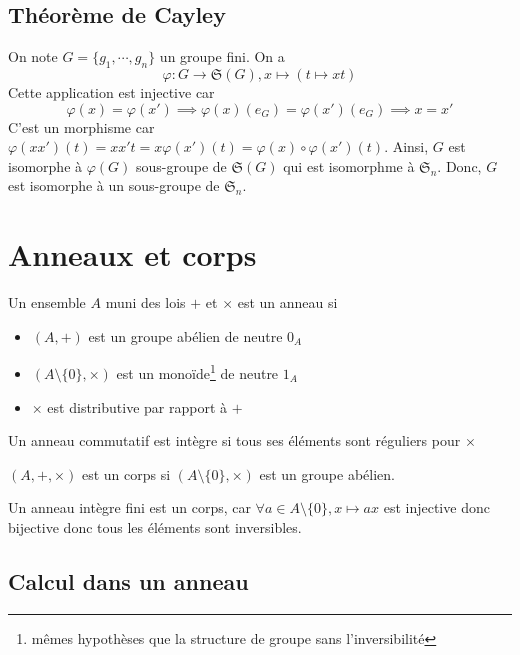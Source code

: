\subsection{Théorème de Cayley}

On note $G=\{g_1, \cdots, g_n\}$ un groupe fini. On a \[
    \varphi: G\to \mathfrak S(G), x\longmapsto (t\longmapsto xt)
\]
Cette application est injective car \[
    \varphi(x)=\varphi(x')\implies \varphi(x)(e_G)=\varphi(x')(e_G)\implies x=x'
\]
C'est un morphisme car $\varphi(xx')(t)=xx't=x\varphi(x')(t)=\varphi(x)\circ \varphi(x')(t)$.
Ainsi, $G$ est isomorphe à $\varphi(G)$ sous-groupe de $\mathfrak S(G)$ qui est isomorphme à $\mathfrak S_n$. Donc, $G$ est isomorphe à un sous-groupe de $\mathfrak S_n$.

\section{Anneaux et corps}

\begin{dfn}
     Un ensemble $A$ muni des lois $+$ et $\times$ est un anneau si \begin{itemize}
        \item $(A, +)$ est un groupe abélien de neutre $0_A$
        \item $(A\setminus\{0\}, \times)$ est un monoïde\footnote{mêmes hypothèses que la structure de groupe sans l'inversibilité} de neutre $1_A$
        \item $\times$ est distributive par rapport à $+$
    \end{itemize}
\end{dfn}

\begin{dfn}
    Un anneau commutatif est intègre si tous ses éléments sont réguliers pour $\times$
\end{dfn}

\begin{dfn}
    $(A, +, \times)$ est un corps si $(A\setminus\{0\}, \times)$ est un groupe abélien.
\end{dfn}

\begin{rem}
    Un anneau intègre fini est un corps, car $\forall a\in A\setminus\{0\}, x\longmapsto ax$ est injective donc bijective donc tous les éléments sont inversibles.
\end{rem}

\subsection{Calcul dans un anneau}

